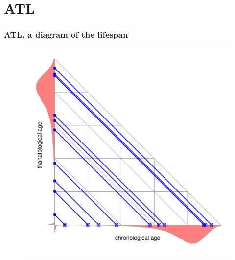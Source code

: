 \documentclass[20pt]{beamer}
\begin{document}
\section{ATL}
\begin{frame}
\frametitle{ATL, a diagram of the lifespan}
\begin{figure}[b]
    \centering
    \includegraphics{Figures/LabPres/ATL4.pdf}
\end{figure} 
\end{frame}
\end{document}
